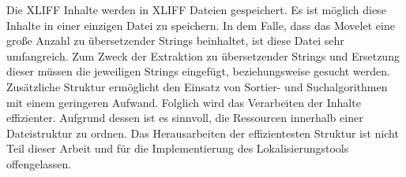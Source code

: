 \par
Die \ac{XLIFF} Inhalte werden in \ac{XLIFF} Dateien gespeichert. Es ist möglich diese Inhalte in einer einzigen Datei zu speichern. In dem Falle, dass das Movelet eine große Anzahl zu übersetzender Strings beinhaltet, ist diese Datei sehr umfangreich. Zum Zweck der Extraktion zu übersetzender Strings und Ersetzung dieser müssen die jeweiligen Strings eingefügt, beziehungsweise gesucht werden. Zusätzliche Struktur ermöglicht den Einsatz von Sortier- und Suchalgorithmen mit einem geringeren Aufwand. 
\autocite[Vgl.][S. 51]{Suresh.2018}
\autocite[Vgl.][S. 1723]{Hoda.2015}
Folglich wird das Verarbeiten der Inhalte effizienter. Aufgrund dessen ist es sinnvoll, die Ressourcen innerhalb einer Dateistruktur zu ordnen. Das Herausarbeiten der effizientesten Struktur ist nicht Teil dieser Arbeit und für die Implementierung des Lokalisierungstools offengelassen.
